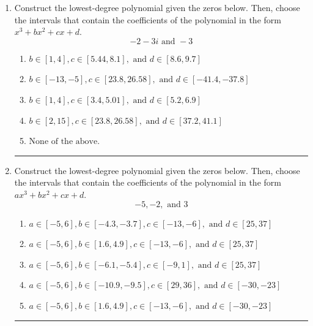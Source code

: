 \documentclass[14pt]{extbook}
\newcommand{\litem}[1]{\item#1\hspace*{-1cm}\rule{\textwidth}{0.4pt}}
\begin{document}
\begin{enumerate}
{\begin{enumerate}[label=\Alph*.]
\end{enumerate} }
\litem{
Construct the lowest-degree polynomial given the zeros below. Then, choose the intervals that contain the coefficients of the polynomial in the form $x^3+bx^2+cx+d$.\[ -2 - 3 i \text{ and } -3 \]\begin{enumerate}[label=\Alph*.]
\item \( b \in [1, 4], c \in [5.44, 8.1], \text{ and } d \in [8.6, 9.7] \)
\item \( b \in [-13, -5], c \in [23.8, 26.58], \text{ and } d \in [-41.4, -37.8] \)
\item \( b \in [1, 4], c \in [3.4, 5.01], \text{ and } d \in [5.2, 6.9] \)
\item \( b \in [2, 15], c \in [23.8, 26.58], \text{ and } d \in [37.2, 41.1] \)
\item \( \text{None of the above.} \)

\end{enumerate} }
\litem{
Construct the lowest-degree polynomial given the zeros below. Then, choose the intervals that contain the coefficients of the polynomial in the form $ax^3+bx^2+cx+d$.\[ -5, -2, \text{ and } 3 \]\begin{enumerate}[label=\Alph*.]
\item \( a \in [-5, 6], b \in [-4.3, -3.7], c \in [-13, -6], \text{ and } d \in [25, 37] \)
\item \( a \in [-5, 6], b \in [1.6, 4.9], c \in [-13, -6], \text{ and } d \in [25, 37] \)
\item \( a \in [-5, 6], b \in [-6.1, -5.4], c \in [-9, 1], \text{ and } d \in [25, 37] \)
\item \( a \in [-5, 6], b \in [-10.9, -9.5], c \in [29, 36], \text{ and } d \in [-30, -23] \)
\item \( a \in [-5, 6], b \in [1.6, 4.9], c \in [-13, -6], \text{ and } d \in [-30, -23] \)


\end{enumerate}}
\end{enumerate}
\end{document}
